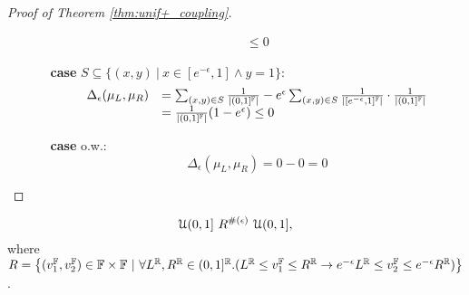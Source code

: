 \documentclass[a4paper,11pt]{article}
\begin{document}
\begin{proof}[Proof of Theorem \ref{thm:unif+_coupling}]
\begin{itemize}
\begin{itemize}
\[\begin{array}{ll}
		 \leq 0 
		 \end{array}
		 \]
	 	\item[{\bf case}] $S \subseteq \{(x, y) 
	 	~|~ x \in [e^{-\epsilon}, 1] \land y = 1 \}$:
		 \[
		 \begin{array}{ll}
		 \Delta_{\epsilon}(\mu_L, \mu_R) 
		 & = 
		 \sum_{(x,y) \in S} 
			\frac{1}{\left \vert (0, 1]^{\mathbb{F}} \right \vert} 
			 - 
		 e^{\epsilon} \sum_{(x,y) \in S} \frac{1}{\left \vert [e^{-\epsilon}, 1]^{\mathbb{F}} \right \vert} 
			\cdot
			\frac{1}{\left \vert (0, 1]^{\mathbb{F}} \right \vert} \\
		 &  = \frac{1}{\left \vert (0, 1]^{\mathbb{F}} \right \vert}
		 (1 - e^{\epsilon}) \leq 0
		 \end{array}
		 \]
	 	\item[{\bf case}] o.w.:
		 \[
		 \Delta_{\epsilon}(\mu_L, \mu_R) = 0 - 0 =  0 
		 \]	 	

	 \end{itemize}

\end{itemize}
\end{proof}
%
%
\begin{thm}
\label{thm:unif-_coupling}
$${\mathcal{U}(0,1]} ~ R^{\#(\epsilon)} ~ {\mathcal{U}(0,1]},$$
%
where
	$R = 
		\left \{(v^{\mathbb{F}}_1, v^{\mathbb{F}}_2) \in {\mathbb{F}} \times {\mathbb{F}} 
		~|~
		\forall L^{\mathbb{R}}, R^{\mathbb{R}} \in (0,1]^{\mathbb{R}}.
		(L^{\mathbb{R}} \leq v^{\mathbb{F}}_1 \leq R^{\mathbb{R}}
				\rightarrow
				e^{-\epsilon} L^{\mathbb{R}} \leq v^{\mathbb{F}}_2 \leq 	e^{-\epsilon} R^{\mathbb{R}})
		\right \}	
		$.
\end{thm}
%
\end{document}
